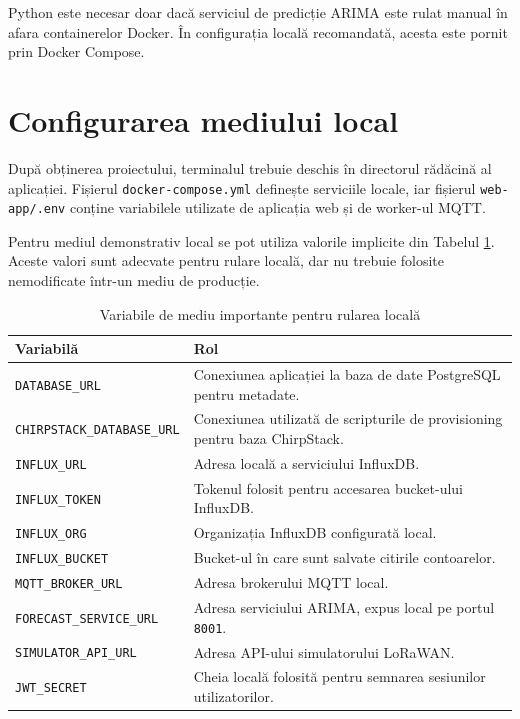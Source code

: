 Python este necesar doar dacă serviciul de predicție ARIMA este rulat manual în afara containerelor Docker. În configurația locală recomandată, acesta este pornit prin Docker Compose.

\section{Configurarea mediului local}

După obținerea proiectului, terminalul trebuie deschis în directorul rădăcină al aplicației. Fișierul \texttt{docker-compose.yml} definește serviciile locale, iar fișierul \texttt{web-app/.env} conține variabilele utilizate de aplicația web și de worker-ul MQTT.

Pentru mediul demonstrativ local se pot utiliza valorile implicite din Tabelul \ref{tab:variabile-mediu}. Aceste valori sunt adecvate pentru rulare locală, dar nu trebuie folosite nemodificate într-un mediu de producție.

\begin{table}[htbp]
\centering
\small
\begin{tabular}{|p{}|p{}|}
\hline
\textbf{Variabilă} & \textbf{Rol} \\
\hline
\texttt{DATABASE\_URL} & Conexiunea aplicației la baza de date PostgreSQL pentru metadate. \\
\hline
\texttt{CHIRPSTACK\_DATABASE\_URL} & Conexiunea utilizată de scripturile de provisioning pentru baza ChirpStack. \\
\hline
\texttt{INFLUX\_URL} & Adresa locală a serviciului InfluxDB. \\
\hline
\texttt{INFLUX\_TOKEN} & Tokenul folosit pentru accesarea bucket-ului InfluxDB. \\
\hline
\texttt{INFLUX\_ORG} & Organizația InfluxDB configurată local. \\
\hline
\texttt{INFLUX\_BUCKET} & Bucket-ul în care sunt salvate citirile contoarelor. \\
\hline
\texttt{MQTT\_BROKER\_URL} & Adresa brokerului MQTT local. \\
\hline
\texttt{FORECAST\_SERVICE\_URL} & Adresa serviciului ARIMA, expus local pe portul \texttt{8001}. \\
\hline
\texttt{SIMULATOR\_API\_URL} & Adresa API-ului simulatorului LoRaWAN. \\
\hline
\texttt{JWT\_SECRET} & Cheia locală folosită pentru semnarea sesiunilor utilizatorilor. \\
\hline
\end{tabular}
\caption{Variabile de mediu importante pentru rularea locală}
\label{tab:variabile-mediu}
\end{table}

